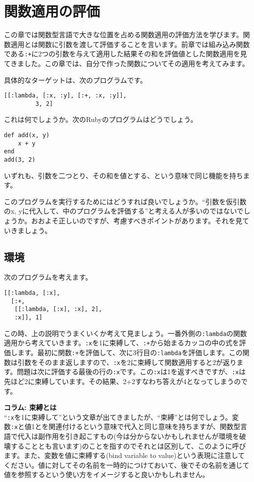 \chapter{関数適用の評価\hspace{-3mm}}

この章では関数型言語で大きな位置を占める関数適用の評価方法を学びます。関数適用とは関数に引数を渡して評価することを言います。前章では組み込み関数である{\tt :+}に2つの引数を与えて適用した結果その和を評価値とした関数適用を見てきました。この章では、自分で作った関数についてその適用を考えてみます。

具体的なターゲットは、次のプログラムです。

\begin{lstlisting}
[[:lambda, [:x, :y], [:+, :x, :y]],
         3, 2]
\end{lstlisting}

これは何でしょうか。次のRubyのプログラムはどうでしょう。
\begin{lstlisting}
def add(x, y)
    x + y
end
add(3, 2)
\end{lstlisting}
いずれも、引数を二つとり、その和を値とする、という意味で同じ機能を持ちます。

このプログラムを実行するためにはどうすれば良いでしょうか。“引数を仮引数のx, yに代入して、中のプログラムを評価する”と考える人が多いのではないでしょうか。おおよそ正しいのですが、考慮すべきポイントがあります。それを見ていきましょう。


\section{環境}
次のプログラムを考えます。

\begin{lstlisting}
[[:lambda, [:x],
  [:+, 
   [[:lambda, [:x], :x], 2],
   :x]], 1]
\end{lstlisting}

この時、上の説明でうまくいくか考えて見ましょう。一番外側の{\tt :lambda}の関数適用から考えていきます。{\tt :x}を1に束縛して、{\tt :+}から始まるカッコの中の式を評価します。最初に関数{\tt :+}を評価して、次に3行目の{\tt :lambda}を評価します。この関数は引数をそのまま返しますので、{\tt :x}を2に束縛して関数適用すると2が返ります。問題は次に評価する最後の行の{\tt :x}です。この{\tt :x}は1を返すべきですが、{\tt :x}は先ほど2に束縛しています。その結果、2+2すなわち答えが4となってしまうのです。

\begin{boxnote}
{\bf コラム: 束縛とは} \\

“{\tt :x}を1に束縛して”という文章が出てきましたが、“束縛”とは何でしょう。変数{\tt :x}と値1とを関連付けるという意味で代入と同じ意味を持ちますが、関数型言語で代入は副作用を引き起こすもの(今は分からないかもしれませんが環境を破壊することとも言います)のことを指すのでそれとは区別して、このように呼びます。また、変数を値に束縛する(bind variable to value)という表現に注意してください。値に対してその名前を一時的につけておいて、後でその名前を通じて値を参照するという使い方をイメージすると良いかもしれません。
\end{boxnote}

